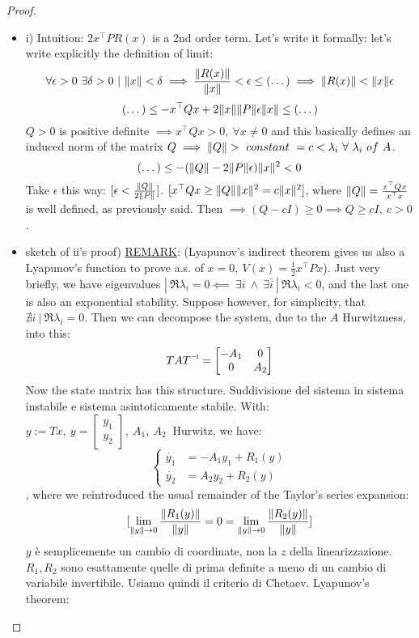 \begin{proof}
\begin{itemize}
\item{i)}
Intuition: $2x^\top PR(x)$ is a 2nd order term. Let's write it formally: let's write explicitly the definition of limit:
\[
	\forall \epsilon > 0\ \exists \delta > 0\ |\ \lVert x\rVert<\delta \implies \frac{\lVert R(x)\rVert}{\lVert x\rVert} < \epsilon \leq (\dots) \implies \lVert R(x)\rVert < \lVert x\rVert\epsilon
\]
\[
	(\dots) \leq -x^\top Qx + 2\lVert x\rVert\lVert P\rVert\epsilon\lVert x\rVert \leq (\dots)
\]
$Q > 0$ is positive definite $\implies x^\top Qx > 0,\ \forall x \neq 0$ and this basically defines an induced norm of the matrix $Q \implies \lVert Q\rVert >\ constant\ = c < \lambda_i\ \forall \ \lambda_i\ of\ A$.
\[
	(\dots) \leq -(\lVert Q\rVert-2\lVert P\rVert\epsilon)\lVert x\rVert^2 < 0
\]
Take $\epsilon$ this way: $[\epsilon < \frac{\lVert Q\rVert}{2\lVert P\rVert}]$. $[x^\top Qx \geq \lVert Q\rVert\lVert x\rVert^2 = c\lVert x\rVert^2]$, where $\lVert Q\rVert = \frac{x^\top Qx}{x^\top x}$ is well defined, as previously said.
Then $\implies (Q-cI) \geq 0 \implies Q \geq cI,\ c > 0$. \QEDA
\item{sketch of ii's proof)}
\underline{REMARK}: (Lyapunov's indirect theorem gives us also a Lyapunov's function to prove a.s. of $x=0,\ V(x) = \frac{1}{2}x^\top Px$).
Just very briefly, we have eigenvalues $|\ \Re{\lambda_i} = 0 \impliedby\ \exists i\ \land\ \exists \bar{i}\ |\ \Re{\lambda_i} < 0$, and the last one is also an exponential stability.
Suppose however, for simplicity, that $\nexists i\ |\ \Re{\lambda_i} = 0$. Then we can decompose the system, due to the $A$ Hurwitzness, into this:
\[
	TA\inv{T} = \begin{bmatrix}-A_1 & 0 \\ 0 & A_2\end{bmatrix}
\]
Now the state matrix has this structure. Suddivisione del sistema in sistema instabile e sistema asintoticamente stabile. With: $y:=Tx,\ y=\begin{bmatrix}y_1\\y_2\end{bmatrix},\ A_1,\ A_2\ $ Hurwitz, we have:
\[
	\left\{
	\begin{aligned}
	\dot{y_1} &= -A_1y_1 + R_1(y)\\
	\dot{y_2} &= A_2y_2 + R_2(y)
	\end{aligned}
	\right.
\]
, where we reintroduced the usual remainder of the Taylor's series expansion:
\[
	[\lim_{\lVert y\rVert\to 0}{\frac{\lVert R_1(y)\rVert}{\lVert y\rVert}} = 0 = \lim_{\lVert y\rVert\to 0}{\frac{\lVert R_2(y)\rVert}{\lVert y\rVert}}]
\]
$y$ è semplicemente un cambio di coordinate, non la $z$ della linearizzazione. $R_1,R_2$ sono esattamente quelle di prima definite a meno di un cambio di variabile invertibile. Usiamo quindi il criterio di Chetaev. Lyapunov's theorem:


\end{itemize}
\end{proof}
